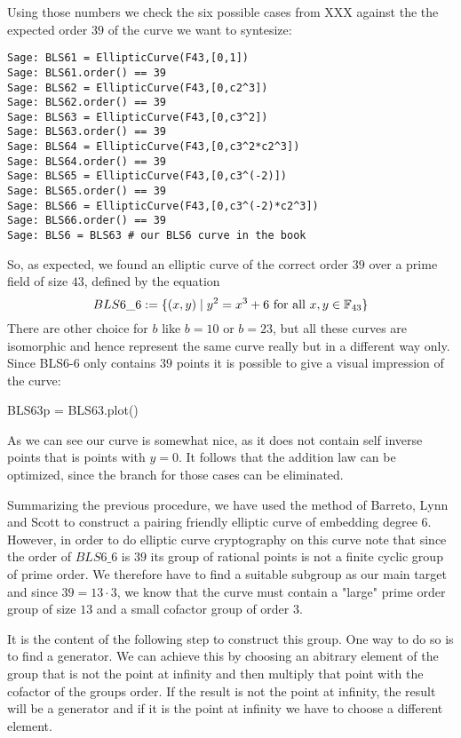 Using those numbers we check the six possible cases from XXX against the the expected order $39$ of the curve we want to syntesize:

\begin{verbatim}
Sage: BLS61 = EllipticCurve(F43,[0,1])
Sage: BLS61.order() == 39
Sage: BLS62 = EllipticCurve(F43,[0,c2^3])
Sage: BLS62.order() == 39
Sage: BLS63 = EllipticCurve(F43,[0,c3^2])
Sage: BLS63.order() == 39
Sage: BLS64 = EllipticCurve(F43,[0,c3^2*c2^3])
Sage: BLS64.order() == 39
Sage: BLS65 = EllipticCurve(F43,[0,c3^(-2)])
Sage: BLS65.order() == 39
Sage: BLS66 = EllipticCurve(F43,[0,c3^(-2)*c2^3])
Sage: BLS66.order() == 39
Sage: BLS6 = BLS63 # our BLS6 curve in the book
\end{verbatim}
So, as expected, we found an elliptic curve of the correct order $39$ over a prime field of size $43$, defined by the equation
\begin{equation}
BLS6\_6 := \{(x,y)\;|\; y^2 = x^3 + 6 \text{ for all } x,y \in \mathbb{F}_{43}\}
\end{equation}
There are other choice for $b$ like $b=10$ or $b=23$, but all these curves are isomorphic and hence represent the same curve really but in a different way only. Since BLS6-6 only contains $39$ points it is possible to give a visual impression of the curve:
\begin{sagesilent}
BLS63p = BLS63.plot()
\end{sagesilent}
\begin{center} 
\end{center}
As we can see our curve is somewhat nice, as it does not contain self inverse points that is points with $y=0$. It follows that the addition law can be optimized, since the branch for those cases can be eliminated. 

Summarizing the previous procedure, we have used the method of Barreto, Lynn and Scott to construct a pairing friendly elliptic curve of embedding degree $6$. However, in order to do elliptic curve cryptography on this curve note that since the order of $BLS6\_6$ is $39$ its group of rational points is not a finite cyclic group of prime order. We therefore have to find a suitable subgroup as our main target and since $39=13\cdot 3$, we know that the curve must contain a "large" prime order group of size $13$ and a small cofactor group of order $3$. 

It is the content of the following step to construct this group. One way to do so is to find a generator. We can achieve this by choosing an abitrary element of the group that is not the point at infinity and then multiply that point with the cofactor of the groups order. If the result is not the point at infinity, the result will be a generator and if it is the point at infinity we have to choose a different element. 

